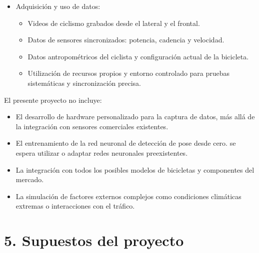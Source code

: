 \documentclass[
11pt, %
]{charter}
\begin{document}
\begin{itemize}
\item Adquisición y uso de datos:
    \begin{itemize}
        \item Videos de ciclismo grabados desde el lateral y el frontal.
        \item Datos de sensores sincronizados: potencia, cadencia y velocidad.
        \item Datos antropométricos del ciclista y configuración actual de la bicicleta.
        \item Utilización de recursos propios y entorno controlado para pruebas sistemáticas y sincronización precisa.
    \end{itemize}
\end{itemize}

El presente proyecto no incluye:
\begin{itemize}
\item El desarrollo de hardware personalizado para la captura de datos, más allá de la integración con sensores comerciales existentes.
\item El entrenamiento de la red neuronal de detección de pose desde cero. se espera utilizar o adaptar redes neuronales preexistentes.
\item La integración con todos los posibles modelos de bicicletas y componentes del mercado.
\item La simulación de factores externos complejos como condiciones climáticas extremas o interacciones con el tráfico.
\end{itemize}

\section{5. Supuestos del proyecto}
\label{sec:supuestos}
\end{document}

